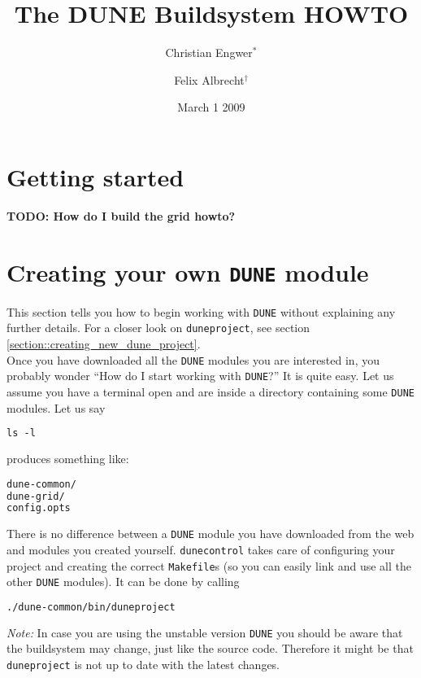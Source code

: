 \documentclass[11pt,a4paper,headinclude,footinclude,DIV16,normalheadings]{scrartcl}
\title{The DUNE Buildsystem HOWTO}
\author{Christian Engwer$^\ast$ \and
Felix Albrecht$^\dagger$}
\date{March 1 2009}
\newcommand{\dune}{\texttt{DUNE}\xspace}
\newcommand{\dunecontrol}{\texttt{dunecontrol}\xspace}
\newcommand{\duneproject}{\texttt{duneproject}\xspace}
\begin{document}
\maketitle
\tableofcontents
\pagebreak

\section{Getting started}\label{section::getting_started}

\textbf{TODO: How do I build the grid howto?}

\section{Creating your own \dune module}\label{section::creating_dune_module}

This section tells you how to begin working with \dune without explaining any
further details. For a closer look on \duneproject, see section
\ref{section::creating_new_dune_project}.\\

Once you have downloaded all the \dune modules you are interested in, you probably
wonder ``How do I start working with \dune?'' It is quite easy.
Let us assume you have a terminal open and are inside a directory containing
some \dune modules. Let us say
 
\begin{lstlisting}[language=make]
ls -l
\end{lstlisting}
produces something like:

\begin{lstlisting}[language=make]
dune-common/
dune-grid/
config.opts
\end{lstlisting}

There is no difference between a \dune module you have downloaded from
the web and modules you created yourself.
\dunecontrol takes care of configuring your project and creating the
correct \texttt{Makefile}s (so you can easily link and use all the other \dune
modules). It can be done by calling
 
\begin{lstlisting}[language=make]
./dune-common/bin/duneproject
\end{lstlisting}

\emph{Note:} In case you are using the unstable version
\dune you should be aware that the buildsystem may change,
just like the source code. Therefore it might be that
\texttt{duneproject} is not up to date with the latest changes. \\
\end{document}

